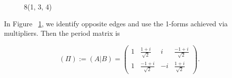 \documentclass[12pt,reqno]{amsart}
\DeclareMathOperator{\Aut}{Aut}
\theoremstyle{definition}
\theoremstyle{remark}
\begin{document}
\begin{figure}[htbp]
    \centering
    \qquad
    \caption{8(1, 3, 4)}%
    \label{fig:134}%
\end{figure}

In Figure~ \cref{fig:134}, we identify opposite edges and use the 1-forms achieved via multipliers. Then the period matrix is 

$$(\Pi) := (A | B) = \begin{pmatrix}1 & \frac{1 + i}{\sqrt{2}} & i & \frac{-1 + i}{\sqrt{2}}\\
1 & \frac{-1 + i}{\sqrt{2}} & -i & \frac{1 + i}{\sqrt{2}} \end{pmatrix}.$$


\end{document}
